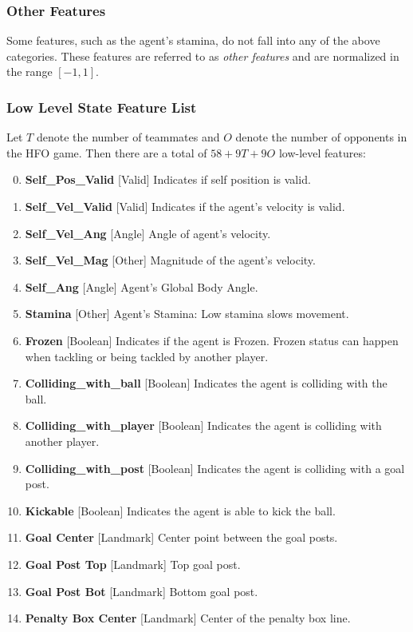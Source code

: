 \documentclass[12pt]{article}
\def\itemrange#1{%
\addtocounter{enumi}{1}%
\edef\labelenumi{\theenumi--\noexpand\theenumi}%
\addtocounter{enumi}{-1}%
\addtocounter{enumi}{#1}%
\item
\def\labelenumi{\theenumi}}
\renewcommand*{\labelenumi}{\theenumi}
\begin{document}
\subsubsection{Other Features}
Some features, such as the agent's stamina, do not fall into any of
the above categories. These features are referred to as \textit{other
  features} and are normalized in the range $[-1, 1]$.

\subsubsection{Low Level State Feature List}
Let $T$ denote the number of teammates and $O$ denote the number of
opponents in the HFO game. Then there are a total of $58 + 9T + 9O$
low-level features:

\begin{enumerate}[noitemsep]
\setcounter{enumi}{-1}
  \item{\textbf{Self\_Pos\_Valid} [Valid] Indicates if self position is valid.}
  \item{\textbf{Self\_Vel\_Valid} [Valid] Indicates if the agent's velocity is valid.}
  \itemrange{1}{\textbf{Self\_Vel\_Ang} [Angle] Angle of agent's velocity.}
  \item{\textbf{Self\_Vel\_Mag} [Other] Magnitude of the agent's velocity.}
  \itemrange{1}{\textbf{Self\_Ang} [Angle] Agent's Global Body Angle.}
  \item{\textbf{Stamina} [Other] Agent's Stamina: Low stamina slows movement.}
  \item{\textbf{Frozen} [Boolean] Indicates if the agent is Frozen. Frozen status can
    happen when tackling or being tackled by another player.}
  \item{\textbf{Colliding\_with\_ball} [Boolean] Indicates the agent
    is colliding with the ball.}
  \item{\textbf{Colliding\_with\_player} [Boolean] Indicates the agent
    is colliding with another player.}
  \item{\textbf{Colliding\_with\_post} [Boolean] Indicates the agent
    is colliding with a goal post.}
  \item{\textbf{Kickable} [Boolean] Indicates the agent is able to
    kick the ball.}
  \itemrange{2}{\textbf{Goal Center} [Landmark] Center point between the goal posts.}
  \itemrange{2}{\textbf{Goal Post Top} [Landmark] Top goal post.}
  \itemrange{2}{\textbf{Goal Post Bot} [Landmark] Bottom goal post.}
  \itemrange{2}{\textbf{Penalty Box Center} [Landmark] Center of the penalty box line.}

\end{enumerate}
\end{document}
